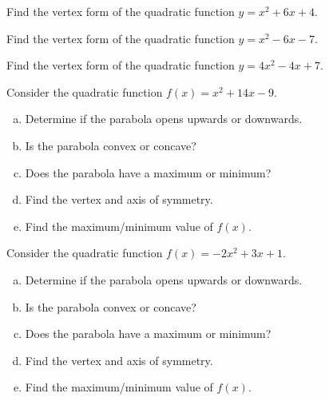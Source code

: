 \documentclass[11pt,letterpaper]{article}
\begin{document}

 Find the vertex form of the quadratic function $y= x^2 + 6x + 4$. \pspace





\newpage





 Find the vertex form of the quadratic function $y= x^2 - 6x - 7$. \pspace





\newpage





 Find the vertex form of the quadratic function $y= 4x^2 - 4x + 7$. \pspace





\newpage





 Consider the quadratic function $f(x)= x^2 + 14 x - 9$.
\begin{enumerate}[(a)]
\item Determine if the parabola opens upwards or downwards.
\item Is the parabola convex or concave?
\item Does the parabola have a maximum or minimum? 
\item Find the vertex and axis of symmetry. 
\item Find the maximum/minimum value of $f(x)$. 
\end{enumerate} \pspace





\newpage





 Consider the quadratic function $f(x)= -2x^2 + 3x + 1$.
\begin{enumerate}[(a)]
\item Determine if the parabola opens upwards or downwards.
\item Is the parabola convex or concave?
\item Does the parabola have a maximum or minimum? 
\item Find the vertex and axis of symmetry. 
\item Find the maximum/minimum value of $f(x)$. 
\end{enumerate} \pspace


\end{document}
